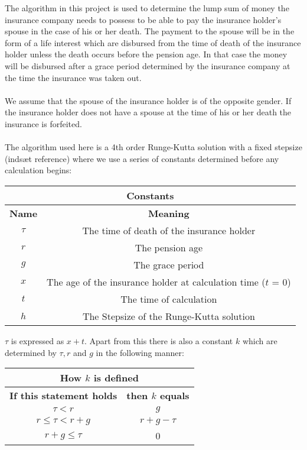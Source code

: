
The algorithm in this project is used to determine the lump sum of money the insurance company needs to possess to be able to pay the insurance holder's spouse in the case of his or her death. The payment to the spouse will be in the form of a life interest which are disbursed from the time of death of the insurance holder unless the death occurs before the pension age. In that case the money will be disbursed after a grace period determined by the insurance company at the time the insurance was taken out. 
\\
\\ We assume that the spouse of the insurance holder is of the opposite gender. If the insurance holder does not have a spouse at the time of his or her death the insurance is forfeited.
\\
\\The algorithm used here is a 4th order Runge-Kutta solution with a fixed stepsize (indsæt reference) where we use a series of constants determined before any calculation begins:

\begin{center}
\begin{tabular}[t]{|c|c|}
\multicolumn{2}{c}{Constants}\\\hline
\textbf{Name}&\textbf{Meaning}\\\hline
$\tau$&The time of death of the insurance holder\\\hline
$r$&The pension age\\\hline
$g$&The grace period\\\hline
$x$&The age of the insurance holder at calculation time ($t$ = 0)\\\hline
$t$&The time of calculation\\\hline
$h$&The Stepsize of the Runge-Kutta solution\\\hline
\end{tabular}
\end{center}

$\tau$ is expressed as $x+t$. Apart from this there is also a constant $k$ which are determined by $\tau, r$ and $g$ in the following manner:

\begin{center}
	\begin{tabular}[t]{|c|c|}
		\multicolumn{2}{c}{How $k$ is defined}\\\hline
		\textbf{If this statement holds}&\textbf{then $k$ equals}\\\hline
		$\tau < r$&$g$\\\hline
		$r \leq \tau < r + g$& $r + g - \tau$\\\hline
		$r + g \leq \tau$&0\\\hline
	\end{tabular}
\end{center}

